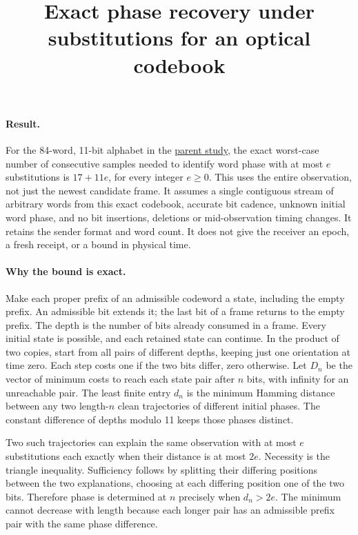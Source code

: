 \documentclass{article}
\title{Exact phase recovery under substitutions for an optical codebook}
\begin{document}
\maketitle

\paragraph{Result.}
For the 84-word, 11-bit alphabet in the
\href{../Optical_Frame_Acquisition.tex}{parent study}, the exact
worst-case number of consecutive samples needed to identify word
phase with at most \(e\) substitutions is \(17+11e\), for every
integer \(e\geq 0\). This uses the entire observation, not just
the newest candidate frame. It assumes a single contiguous stream
of arbitrary words from this exact codebook, accurate bit cadence,
unknown initial word phase, and no bit insertions, deletions or
mid-observation timing changes. It retains the sender format and
word count. It does not give the receiver an epoch, a fresh receipt,
or a bound in physical time.

\paragraph{Why the bound is exact.}
Make each proper prefix of an admissible codeword a state,
including the empty prefix. An admissible bit extends it; the
last bit of a frame returns to the empty prefix. The depth is the
number of bits already consumed in a frame. Every initial state
is possible, and each retained state can continue. In the product
of two copies, start from all pairs of different depths, keeping
just one orientation at time zero. Each step costs one if the two
bits differ, zero otherwise. Let \(D_n\) be the vector of minimum
costs to reach each state pair after \(n\) bits, with infinity for
an unreachable pair. The least finite entry \(d_n\) is the minimum
Hamming distance between any two length-\(n\) clean trajectories
of different initial phases. The constant difference of depths
modulo 11 keeps those phases distinct.

Two such trajectories can explain the same observation with at
most \(e\) substitutions each exactly when their distance is at
most \(2e\). Necessity is the triangle inequality. Sufficiency
follows by splitting their differing positions between the two
explanations, choosing at each differing position one of the two
bits. Therefore phase is determined at \(n\) precisely when
\(d_n>2e\). The minimum cannot decrease with length because
each longer pair has an admissible prefix pair with the same
phase difference.
\end{document}
